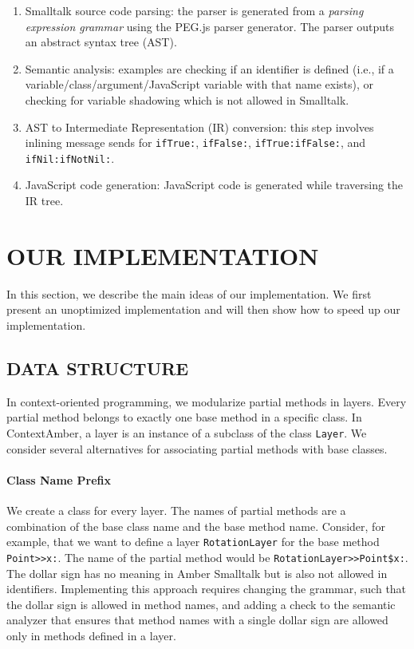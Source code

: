 \documentclass[english,paper=a4,twocolumn=true,DIV=calc,fontsize=9pt]{scrartcl}
\begin{document}
\begin{enumerate}
    \item Smalltalk source code parsing: the parser is generated from a \emph{parsing expression grammar} using the PEG.js parser generator. The parser outputs an abstract syntax tree (AST).
    \item Semantic analysis: examples are checking if an identifier is defined (i.e., if a variable/class/argument/JavaScript variable with that name exists), or checking for variable shadowing which is not allowed in Smalltalk.
    \item AST to Intermediate Representation (IR) conversion: this step involves inlining message sends for \texttt{ifTrue:}, \texttt{ifFalse:}, \texttt{ifTrue:ifFalse:}, and \texttt{ifNil:ifNotNil:}.
    \item JavaScript code generation: JavaScript code is generated while traversing the IR tree.
\end{enumerate}

\section{OUR IMPLEMENTATION}
In this section, we describe the main ideas of our implementation. We first present an unoptimized implementation and will then show how to speed up our implementation.

\subsection{DATA STRUCTURE}
In context-oriented programming, we modularize partial methods in layers. Every partial method belongs to exactly one base method in a specific class. In ContextAmber, a layer is an instance of a subclass of the class \texttt{Layer}. We consider several alternatives for associating partial methods with base classes.

\paragraph{Class Name Prefix}
We create a class for every layer. The names of partial methods are a combination of the base class name and the base method name. Consider, for example, that we want to define a layer \texttt{RotationLayer} for the base method \texttt{Point>>x:}. The name of the partial method would be \texttt{RotationLayer>>Point\$x:}. The dollar sign has no meaning in Amber Smalltalk but is also not allowed in identifiers. Implementing this approach requires changing the grammar, such that the dollar sign is allowed in method names, and adding a check to the semantic analyzer that ensures that method names with a single dollar sign are allowed only in methods defined in a layer.
\end{document}
